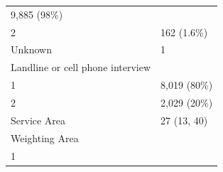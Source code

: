 \documentclass[]{article}
\begin{document}
\begin{longtable}[]{@{}ll@{}}
\begin{minipage}[t]{0.23\columnwidth}
9,885 (98\%)\strut
\end{minipage}\tabularnewline
\begin{minipage}[t]{0.71\columnwidth}\raggedright
2\strut
\end{minipage} & \begin{minipage}[t]{0.23\columnwidth}\raggedright
162 (1.6\%)\strut
\end{minipage}\tabularnewline
\begin{minipage}[t]{0.71\columnwidth}\raggedright
Unknown\strut
\end{minipage} & \begin{minipage}[t]{0.23\columnwidth}\raggedright
1\strut
\end{minipage}\tabularnewline
\begin{minipage}[t]{0.71\columnwidth}\raggedright
Landline or cell phone interview\strut
\end{minipage} & \begin{minipage}[t]{0.23\columnwidth}\raggedright
\strut
\end{minipage}\tabularnewline
\begin{minipage}[t]{0.71\columnwidth}\raggedright
1\strut
\end{minipage} & \begin{minipage}[t]{0.23\columnwidth}\raggedright
8,019 (80\%)\strut
\end{minipage}\tabularnewline
\begin{minipage}[t]{0.71\columnwidth}\raggedright
2\strut
\end{minipage} & \begin{minipage}[t]{0.23\columnwidth}\raggedright
2,029 (20\%)\strut
\end{minipage}\tabularnewline
\begin{minipage}[t]{0.71\columnwidth}\raggedright
Service Area\strut
\end{minipage} & \begin{minipage}[t]{0.23\columnwidth}\raggedright
27 (13, 40)\strut
\end{minipage}\tabularnewline
\begin{minipage}[t]{0.71\columnwidth}\raggedright
Weighting Area\strut
\end{minipage} & \begin{minipage}[t]{0.23\columnwidth}\raggedright
\strut
\end{minipage}\tabularnewline
\begin{minipage}[t]{0.71\columnwidth}\raggedright
1\strut
\end{minipage} & \begin{minipage}[t]{0.23\columnwidth}\raggedright

\end{minipage}
\end{longtable}
\end{document}
